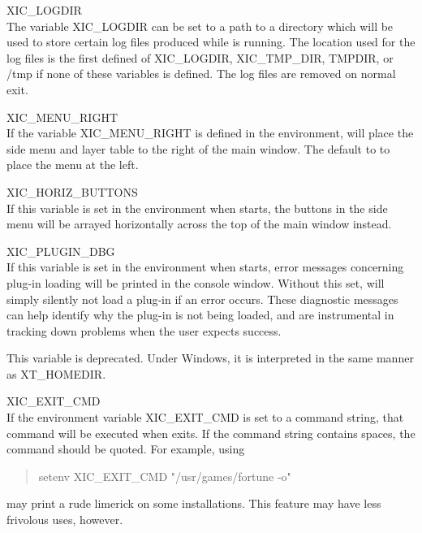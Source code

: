 \begin{description}
\item{\et XIC\_LOGDIR}\\
The variable {\et XIC\_LOGDIR} can be set to a path to a directory
which will be used to store certain log files produced while {\Xic} is
running.  The location used for the log files is the first defined of
{\et XIC\_LOGDIR}, {\et XIC\_TMP\_DIR}, {\et TMPDIR}, or {\vt /tmp} if
none of these variables is defined.  The log files are removed on
normal exit.

\item{\et XIC\_MENU\_RIGHT}\\
If the variable {\et XIC\_MENU\_RIGHT} is defined in the environment,
{\Xic} will place the side menu and layer table to the right of the
main window.  The default to to place the menu at the left.

\item{\et XIC\_HORIZ\_BUTTONS}\\
If this variable is set in the environment when {\Xic} starts, the
buttons in the side menu will be arrayed horizontally across the top
of the main window instead.

\item{\et XIC\_PLUGIN\_DBG}\\
If this variable is set in the environment when {\Xic} starts, error
messages concerning plug-in loading will be printed in the console
window.  Without this set, {\Xic} will simply silently not load a
plug-in if an error occurs.  These diagnostic messages can help
identify why the plug-in is not being loaded, and are instrumental in
tracking down problems when the user expects success.

This variable is deprecated.  Under Windows, it is interpreted in the
same manner as {\et XT\_HOMEDIR}.

\item{\et XIC\_EXIT\_CMD}\\
If the environment variable {\et XIC\_EXIT\_CMD} is set to a command string,
that command will be executed when {\Xic} exits.  If the command string
contains spaces, the command should be quoted.  For example, using
\begin{quote}
{\vt setenv XIC\_EXIT\_CMD "/usr/games/fortune -o"}
\end{quote}
may print a rude limerick on some installations.  This feature may
have less frivolous uses, however.


\end{description}
